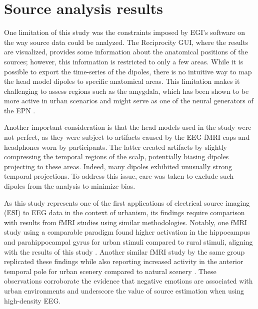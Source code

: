 \section{Source analysis results}

One limitation of this study was the constraints imposed by EGI's software on the way source data could be analyzed. The Reciprocity GUI, where the results are visualized, provides some information about the anatomical positions of the sources; however, this information is restricted to only a few areas. While it is possible to export the time-series of the dipoles, there is no intuitive way to map the head model dipoles to specific anatomical areas. This limitation makes it challenging to assess regions such as the amygdala, which has been shown to be more active in urban scenarios and might serve as one of the neural generators of the EPN \cite{grassiniProcessingNaturalScenery2019, kimHumanBrainActivation2010}.

Another important consideration is that the head models used in the study were not perfect, as they were subject to artifacts caused by the EEG-fMRI caps and headphones worn by participants. The latter created artifacts by slightly compressing the temporal regions of the scalp, potentially biasing dipoles projecting to these areas. Indeed, many dipoles exhibited unusually strong temporal projections. To address this issue, care was taken to exclude such dipoles from the analysis to minimize bias.

As this study represents one of the first applications of electrical source imaging (ESI) to EEG data in the context of urbanism, its findings require comparison with results from fMRI studies using similar methodologies. Notably, one fMRI study using a comparable paradigm found higher activation in the hippocampus and parahippocampal gyrus for urban stimuli compared to rural stimuli, aligning with the results of this study \cite{kimHumanBrainActivation2010}. Another similar fMRI study by the same group replicated these findings while also reporting increased activity in the anterior temporal pole for urban scenery compared to natural scenery \cite{kimFunctionalNeuroanatomyAssociated2010}. These observations corroborate the evidence that negative emotions are associated with urban environments and underscore the value of source estimation when using high-density EEG.

